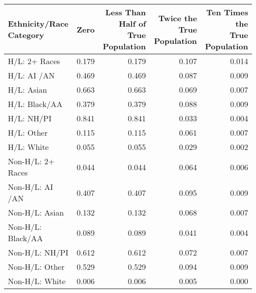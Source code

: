 \begin{table}[ht]
\centering
\begin{tabular}{lrrrr}
 Ethnicity/Race Category & Zero & \thead{Less Than Half of \\ True Population} & \thead{Twice the True \\ Population} & \thead{Ten Times the \\ True Population} \\ 
  \hline
H/L: 2+ Races & 0.179 & 0.179 & 0.107 & 0.014 \\ 
H/L: AI /AN & 0.469 & 0.469 & 0.087 & 0.009 \\ 
  H/L: Asian & 0.663 & 0.663 & 0.069 & 0.007 \\ 
  H/L: Black/AA & 0.379 & 0.379 & 0.088 & 0.009 \\ 
  H/L: NH/PI & 0.841 & 0.841 & 0.033 & 0.004 \\ 
  H/L: Other & 0.115 & 0.115 & 0.061 & 0.007 \\ 
  H/L: White & 0.055 & 0.055 & 0.029 & 0.002 \\ 
   \hline
Non-H/L: 2+ Races & 0.044 & 0.044 & 0.064 & 0.006 \\ 
  Non-H/L: AI /AN & 0.407 & 0.407 & 0.095 & 0.009 \\ 
  Non-H/L: Asian & 0.132 & 0.132 & 0.068 & 0.007 \\ 
  Non-H/L: Black/AA & 0.089 & 0.089 & 0.041 & 0.004 \\ 
  Non-H/L: NH/PI & 0.612 & 0.612 & 0.072 & 0.007 \\ 
  Non-H/L: Other & 0.529 & 0.529 & 0.094 & 0.009 \\ 
  Non-H/L: White & 0.006 & 0.006 & 0.005 & 0.000 \\ 
  \end{tabular}
\end{table}
